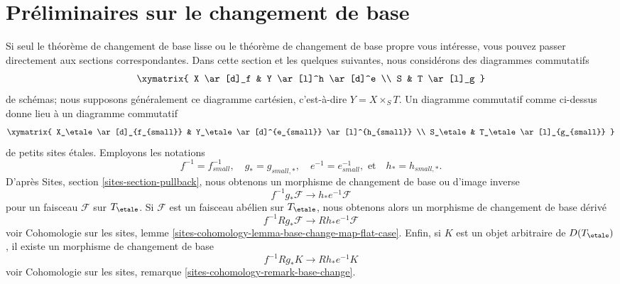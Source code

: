 










\section{Préliminaires sur le changement de base}
\label{section-base-change-preliminaries}

\noindent
Si seul le théorème de changement de base lisse ou le théorème de changement
de base propre vous intéresse, vous pouvez passer directement aux
sections correspondantes.
Dans cette section et les quelques suivantes, nous considérons des diagrammes commutatifs
$$
\xymatrix{
X \ar[d]_f & Y \ar[l]^h \ar[d]^e \\
S & T \ar[l]_g
}
$$
de schémas; nous supposons généralement ce diagramme cartésien,
c'est-à-dire $Y = X \times_S T$. Un diagramme commutatif comme ci-dessus
donne lieu à un diagramme commutatif
$$
\xymatrix{
X_\etale \ar[d]_{f_{small}} & Y_\etale \ar[d]^{e_{small}} \ar[l]^{h_{small}} \\
S_\etale & T_\etale \ar[l]_{g_{small}}
}
$$
de petits sites étales. Employons les notations
$$
f^{-1} = f_{small}^{-1}, \quad
g_* = g_{small, *}, \quad
e^{-1} = e_{small}^{-1}, \text{ et}\quad
h_* = h_{small, *}.
$$
D'après Sites, section \ref{sites-section-pullback},
nous obtenons un morphisme de changement de base ou d'image inverse
$$
f^{-1}g_*\mathcal{F}
\longrightarrow
h_*e^{-1}\mathcal{F}
$$
pour un faisceau $\mathcal{F}$ sur $T_\etale$. Si $\mathcal{F}$ est un faisceau
abélien sur $T_\etale$, nous obtenons alors un morphisme de changement de base dérivé
$$
f^{-1}Rg_*\mathcal{F}
\longrightarrow
Rh_*e^{-1}\mathcal{F}
$$
voir Cohomologie sur les sites, lemme
\ref{sites-cohomology-lemma-base-change-map-flat-case}.
Enfin, si $K$ est un objet arbitraire de $D(T_\etale)$,
il existe un morphisme de changement de base
$$
f^{-1}Rg_*K
\longrightarrow
Rh_*e^{-1}K
$$
voir
Cohomologie sur les sites, remarque \ref{sites-cohomology-remark-base-change}.

